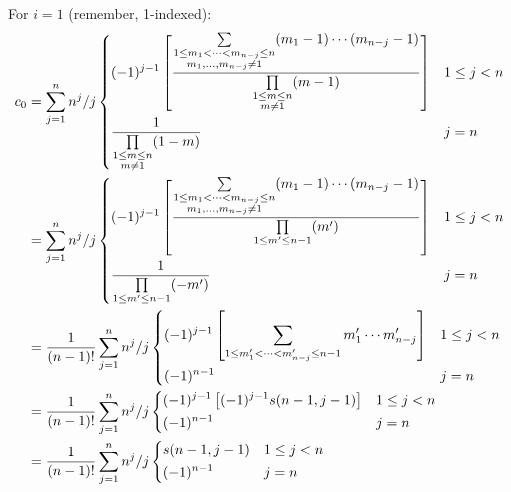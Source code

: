 \documentclass{book}
\begin{document}
For $i=1$ (remember, 1-indexed):
\begin{align}
    c_0 &= \sum_{j=1}^{n} n^{j}/j \begin{dcases}
        (-1)^{j-1} \left[ \frac{\sum\limits_{\substack{1\leq m_1 < \dots < m_{n-j} \leq n \\ m_1, \dots, m_{n-j} \neq 1}} (m_1-1) \cdots (m_{n-j}-1)}{\prod\limits_{\substack{1\leq m \leq n \\ m \neq 1}} (m - 1)} \right] & 1 \leq j < n \\
        \frac{1}{\prod\limits_{\substack{1\leq m \leq n \\ m \neq 1}} (1 - m)} & j = n
    \end{dcases} \nonumber \\
        &= \sum_{j=1}^{n} n^{j}/j \begin{dcases}
        (-1)^{j-1} \left[ \frac{\sum\limits_{\substack{1\leq m_1 < \dots < m_{n-j} \leq n \\ m_1, \dots, m_{n-j} \neq 1}} (m_1-1) \cdots (m_{n-j}-1)}{\prod\limits_{1\leq m' \leq n-1} (m')} \right] & 1 \leq j < n \\
        \frac{1}{\prod\limits_{1\leq m' \leq n-1} (-m')} & j = n
    \end{dcases} \nonumber \\
        &= \frac{1}{(n-1)!} \sum_{j=1}^{n} n^{j}/j \begin{dcases}
        (-1)^{j-1} \left[ \sum\limits_{1 \leq m_1' < \dots < m_{n-j}' \leq n-1} m_1' \cdots m_{n-j}' \right] & 1 \leq j < n \\
        (-1)^{n-1} & j = n
    \end{dcases} \nonumber \\
        &= \frac{1}{(n-1)!} \sum_{j=1}^{n} n^{j}/j \begin{dcases}
        (-1)^{j-1} \left[ (-1)^{j-1} s(n-1, j-1) \right] & 1 \leq j < n \\
        (-1)^{n-1} & j = n
    \end{dcases} \nonumber \\
        &= \frac{1}{(n-1)!} \sum_{j=1}^{n} n^{j}/j \begin{dcases}
        s(n-1, j-1) & 1 \leq j < n \\
        (-1)^{n-1} & j = n
    \end{dcases} \nonumber
\end{align}
\end{document}
